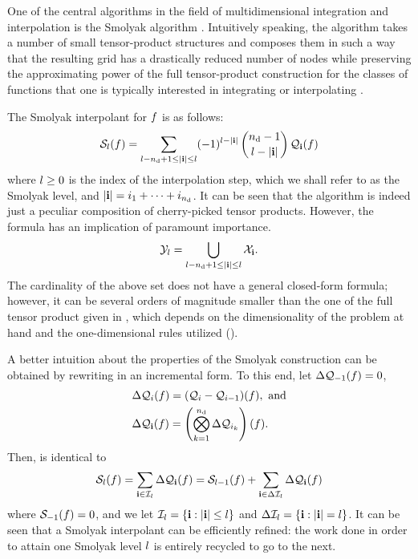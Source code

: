 One of the central algorithms in the field of multidimensional integration and
interpolation is the Smolyak algorithm \cite{smolyak1963}. Intuitively speaking,
the algorithm takes a number of small tensor-product structures and composes
them in such a way that the resulting grid has a drastically reduced number of
nodes while preserving the approximating power of the full tensor-product
construction for the classes of functions that one is typically interested in
integrating or interpolating \cite{klimke2006}.

The Smolyak interpolant for $f$ is as follows:
\begin{equation} \elab{smolyak-original}
  \smolyak{\l}(\f) = \sum_{\l - \nin + 1 \leq |\vi| \leq \l} (-1)^{\l - |\vi|} \, {\nin - 1 \choose \l - |\vi|} \, \tensor{\vi}(\f)
\end{equation}
where $l \geq 0$ is the index of the interpolation step, which we shall refer
to as the Smolyak level, and $|\mathbf{i}| = i_1 + \dots + i_{n_\text{d}}$. It can be seen that
the algorithm is indeed just a peculiar composition of cherry-picked tensor
products. However, the formula has an implication of paramount importance.
\begin{equation} \elab{smolyak-grid}
  \Y_l = \bigcup_{\l - \nin + 1 \leq |\vi| \leq \l} \X_\vi.
\end{equation}
The cardinality of the above set does not have a general closed-form formula;
however, it can be several orders of magnitude smaller than the one of the full
tensor product given in , which depends on the
dimensionality of the problem at hand and the one-dimensional rules utilized
().

A better intuition about the properties of the Smolyak construction can be
obtained by rewriting  in an incremental form. To this
end, let $\Delta\mathcal{Q}_{-1}(f) = 0$,
\begin{align}
  & \Delta\tensor{i}(\f) = (\tensor{i} - \tensor{i - 1})(\f), \text{ and} \elab{tensor-delta-1d} \\
  & \Delta\tensor{\vi}(\f) = \left( \bigotimes_{k = 1}^\nin \Delta\tensor{i_k} \right)(\f). \nonumber
\end{align}
Then,  is identical to
\begin{equation} \elab{smolyak-incremental}
  \smolyak{\l}(\f) = \sum_{\vi \in \lindex_\l} \Delta\tensor{\vi}(\f) = \smolyak{\l - 1}(\f) + \sum_{\vi \in \Delta\lindex_\l} \Delta\tensor{\vi}(\f)
\end{equation}
where $\mathcal{S}_{-1}(f) = 0$, and we let $\mathcal{I}_l = \{ \mathbf{i}: |\mathbf{i}| \leq l
\}$ and $\Delta\mathcal{I}_l = \{ \mathbf{i}: |\mathbf{i}| = l \}$. It can be seen that a
Smolyak interpolant can be efficiently refined: the work done in order to attain
one Smolyak level $l$ is entirely recycled to go to the next.

